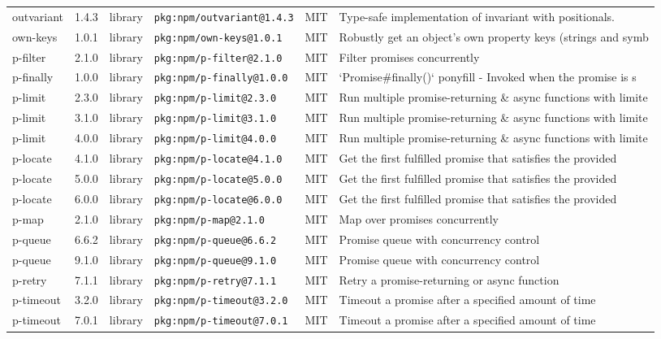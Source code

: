 \documentclass[11pt]{article}
\begin{document}
\begin{longtable}{|l|l|l|p{2.2cm}|l|p{4cm}|}
outvariant & 1.4.3 & library & \texttt{pkg:npm/outvariant@1.4.3} & MIT & Type-safe implementation of invariant with positionals. \\
own-keys & 1.0.1 & library & \texttt{pkg:npm/own-keys@1.0.1} & MIT & Robustly get an object's own property keys (strings and symb \\
p-filter & 2.1.0 & library & \texttt{pkg:npm/p-filter@2.1.0} & MIT & Filter promises concurrently \\
p-finally & 1.0.0 & library & \texttt{pkg:npm/p-finally@1.0.0} & MIT & `Promise\#finally()` ponyfill - Invoked when the promise is s \\
p-limit & 2.3.0 & library & \texttt{pkg:npm/p-limit@2.3.0} & MIT & Run multiple promise-returning \& async functions with limite \\
p-limit & 3.1.0 & library & \texttt{pkg:npm/p-limit@3.1.0} & MIT & Run multiple promise-returning \& async functions with limite \\
p-limit & 4.0.0 & library & \texttt{pkg:npm/p-limit@4.0.0} & MIT & Run multiple promise-returning \& async functions with limite \\
p-locate & 4.1.0 & library & \texttt{pkg:npm/p-locate@4.1.0} & MIT & Get the first fulfilled promise that satisfies the provided  \\
p-locate & 5.0.0 & library & \texttt{pkg:npm/p-locate@5.0.0} & MIT & Get the first fulfilled promise that satisfies the provided  \\
p-locate & 6.0.0 & library & \texttt{pkg:npm/p-locate@6.0.0} & MIT & Get the first fulfilled promise that satisfies the provided  \\
p-map & 2.1.0 & library & \texttt{pkg:npm/p-map@2.1.0} & MIT & Map over promises concurrently \\
p-queue & 6.6.2 & library & \texttt{pkg:npm/p-queue@6.6.2} & MIT & Promise queue with concurrency control \\
p-queue & 9.1.0 & library & \texttt{pkg:npm/p-queue@9.1.0} & MIT & Promise queue with concurrency control \\
p-retry & 7.1.1 & library & \texttt{pkg:npm/p-retry@7.1.1} & MIT & Retry a promise-returning or async function \\
p-timeout & 3.2.0 & library & \texttt{pkg:npm/p-timeout@3.2.0} & MIT & Timeout a promise after a specified amount of time \\
p-timeout & 7.0.1 & library & \texttt{pkg:npm/p-timeout@7.0.1} & MIT & Timeout a promise after a specified amount of time \\

\end{longtable}
\end{document}
